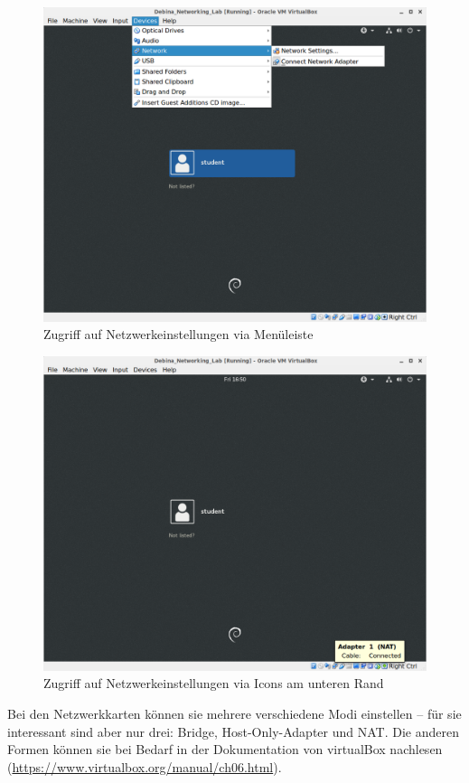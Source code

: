 \documentclass[paper=a4,fontsize=11pt]{scrartcl}%
\numberwithin{equation}{section}
\begin{document}
\begin{figure}[H]
\centering
\includegraphics[scale=0.4]{vbox3}
\caption{Zugriff auf Netzwerkeinstellungen via Menüleiste}
\label{vbox3}
\end{figure}
\begin{figure}[H]
\centering
\includegraphics[scale=0.4]{vbox4}
\caption{Zugriff auf Netzwerkeinstellungen via Icons am unteren Rand}
\label{vbox4}
\end{figure}
Bei den Netzwerkkarten können sie mehrere verschiedene Modi einstellen -- für sie interessant sind aber nur drei: Bridge, Host-Only-Adapter und NAT. Die anderen Formen können sie bei Bedarf in der Dokumentation von virtualBox nachlesen (\url{https://www.virtualbox.org/manual/ch06.html}).
\end{document}
